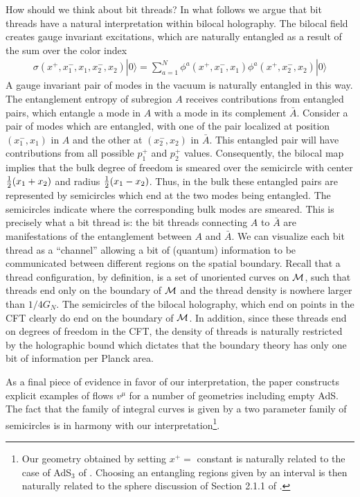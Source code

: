 \documentclass[a4paper,12pt]{article}
\def\bea{\begin{eqnarray}}
\def\eea{\end{eqnarray}}
\begin{document}
How should we think about bit threads?
In what follows we argue that bit threads have a natural interpretation within bilocal holography.
The bilocal field creates gauge invariant excitations, which are naturally entangled as a result of the sum over the
color index
%
\bea
\sigma(x^+,x_1^-,x_1,x_2^-,x_2)|0\rangle = \sum_{a=1}^N\phi^a(x^+,x_1^-,x_1)\phi^a(x^+,x_2^-,x_2)|0\rangle
\eea
%
A gauge invariant pair of modes in the vacuum is naturally entangled in this way.
The entanglement entropy of subregion $A$ receives contributions from entangled pairs, which entangle a mode in $A$
with a mode in its complement $\bar{A}$.
Consider a pair of modes which are entangled, with one of the pair localized at position $(x_1^-,x_1)$ in $A$ and the other
at $(x_2^-,x_2)$ in $\bar{A}$.
This entangled pair will have contributions from all possible $p_1^+$ and $p_2^+$ values.
Consequently, the bilocal map implies that the bulk degree of freedom is smeared over the semicircle with 
center ${1\over 2}(x_1+x_2)$ and radius ${1\over 2}(x_1-x_2)$.
Thus, in the bulk these entangled pairs are represented by semicircles which end at the two modes being entangled.
The semicircles indicate where the corresponding bulk modes are smeared.
This is precisely what a bit thread is: the bit threads connecting $A$ to $\bar{A}$ are manifestations of the entanglement
between $A$ and $\bar{A}$. 
We can visualize each bit thread as a ``channel'' allowing a bit of (quantum) information to be communicated 
between different regions on the spatial boundary. 
Recall that a thread configuration, by definition, is a set of unoriented curves on ${\cal M}$, such that threads end only on 
the boundary of ${\cal M}$ and the thread density is nowhere larger than $1/4G_N$.
The semicircles of the bilocal holography, which end on points in the CFT clearly do end on the boundary of ${\cal M}$.
In addition, since these threads end on degrees of freedom in the CFT, the density of threads is naturally restricted by the
holographic bound which dictates that the boundary theory has only one bit of information per Planck area.

As a final piece of evidence in favor of our interpretation, the paper \cite{Agon:2018lwq} constructs explicit examples 
of flows $v^\mu$ for a number of geometries including empty AdS. 
The fact that the family of integral curves is given by a two parameter family of semicircles is in harmony with
our interpretation\footnote{Our geometry obtained by setting $x^+=$ constant is naturally related to the case of
AdS$_3$ of \cite{Agon:2018lwq}. Choosing an entangling regions given by an interval is then naturally related to the 
sphere discussion of Section 2.1.1 of \cite{Agon:2018lwq}.}.
\end{document}
